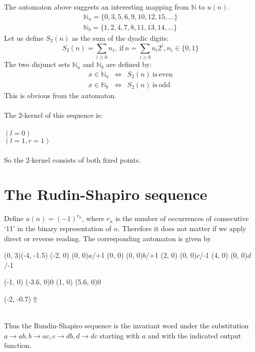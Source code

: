 \documentclass{article}
\begin{document}
The automaton above suggests an interesting mapping from $\mathbb{N}$ to
$u(n)$. 
\begin{eqnarray*}
\mathbb{N}_a = \{0, 3, 5, 6, 9, 10, 12, 15, ...\}\\
\mathbb{N}_b = \{1, 2, 4, 7, 8, 11, 13, 14, ...\}
\end{eqnarray*}
Let us define $S_2(n)$ as the sum of the dyadic digits:
\begin{displaymath}
S_2(n) = \sum_{i \ge 0}n_i,\mathrm{\ if\ }
n = \sum_{i \ge 0}n_i2^i, n_i \in \{0, 1\}
\end{displaymath}
The two disjunct sets $\mathbb{N}_a$ and $\mathbb{N}_b$ are defined by:
\begin{eqnarray*}
x \in \mathbb{N}_a &\Leftrightarrow& S_2(n) \mathrm{\ is\ even}\\
x \in \mathbb{N}_b &\Leftrightarrow& S_2(n) \mathrm{\ is\ odd}
\end{eqnarray*}
This is obvious from the automaton.\\
\\
The 2-kernel of this sequence is:\\
\\
 $(l = 0)$\\
 $(l = 1, r = 1)$\\
\\
So the 2-kernel consists of both fixed points.

\section*{The Rudin-Shapiro sequence}
Define $u(n) = (-1)^{r_n}$, where $r_n$ is the number of occurrences of
consecutive `11' in the binary representation of $n$. Therefore it does not 
matter if we apply direct or reverse reading. The corresponding automaton is
given by\\
\begin{graph}(0, 3)(-4, -1.5)
  (-2, 0) (0, 0){\bs$a$/+1\es}
  (0, 0)  (0, 0){\bs$b$/+1\es}
  (2, 0)  (0, 0){\bs$c$/-1\es}
  (4, 0)  (0, 0){\bs$d$/-1\es}

  (-1, 0) \freetext(-3.6, 0){0}
   
   
   
   
   
  (1, 0) \freetext(5.6, 0){0}
   

  \freetext(-2, -0.7){$\Uparrow$}
\end{graph}\\
Thus the Rundin-Shapiro sequence is the invariant word under the substitution
$a \rightarrow ab, b \rightarrow ac, c \rightarrow db, d \rightarrow dc$
starting with $a$ and with the indicated output function.
\end{document}
